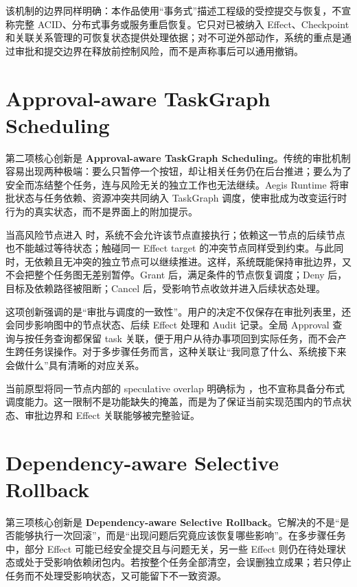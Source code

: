 该机制的边界同样明确：本作品使用“事务式”描述工程级的受控提交与恢复，不宣称完整 ACID、分布式事务或服务重启恢复。它只对已被纳入 Effect、Checkpoint 和关联关系管理的可恢复状态提供处理依据；对不可逆外部动作，系统的重点是通过审批和提交边界在释放前控制风险，而不是声称事后可以通用撤销。

\section{Approval-aware TaskGraph Scheduling}

第二项核心创新是 \textbf{Approval-aware TaskGraph Scheduling}。传统的审批机制容易出现两种极端：要么只暂停一个按钮，却让相关任务仍在后台推进；要么为了安全而冻结整个任务，连与风险无关的独立工作也无法继续。Aegis Runtime 将审批状态与任务依赖、资源冲突共同纳入 TaskGraph 调度，使审批成为改变运行时行为的真实状态，而不是界面上的附加提示。

当高风险节点进入  时，系统不会允许该节点直接执行；依赖这一节点的后续节点也不能越过等待状态；触碰同一 Effect target 的冲突节点同样受到约束。与此同时，无依赖且无冲突的独立节点可以继续推进。这样，系统既能保持审批边界，又不会把整个任务图无差别暂停。Grant 后，满足条件的节点恢复调度；Deny 后，目标及依赖路径被阻断；Cancel 后，受影响节点收敛并进入后续状态处理。

这项创新强调的是“审批与调度的一致性”。用户的决定不仅保存在审批列表里，还会同步影响图中的节点状态、后续 Effect 处理和 Audit 记录。全局 Approval 查询与按任务查询都保留 task 关联，便于用户从待办事项回到实际任务，而不会产生跨任务误操作。对于多步骤任务而言，这种关联让“我同意了什么、系统接下来会做什么”具有清晰的对应关系。

当前原型将同一节点内部的 speculative overlap 明确标为 ，也不宣称具备分布式调度能力。这一限制不是功能缺失的掩盖，而是为了保证当前实现范围内的节点状态、审批边界和 Effect 关联能够被完整验证。

\section{Dependency-aware Selective Rollback}

第三项核心创新是 \textbf{Dependency-aware Selective Rollback}。它解决的不是“是否能够执行一次回滚”，而是“出现问题后究竟应该恢复哪些影响”。在多步骤任务中，部分 Effect 可能已经安全提交且与问题无关，另一些 Effect 则仍在待处理状态或处于受影响依赖闭包内。若按整个任务全部清空，会误删独立成果；若只停止任务而不处理受影响状态，又可能留下不一致资源。

